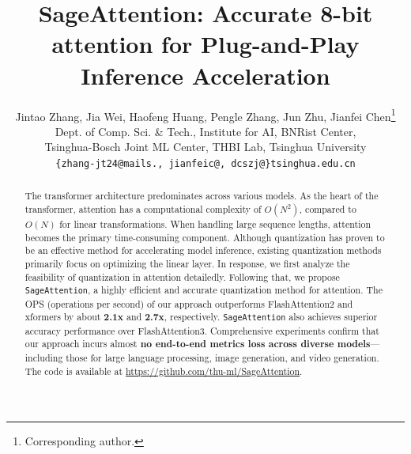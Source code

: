 \documentclass{article} %
\title{SageAttention: Accurate 8-bit attention for Plug-and-Play Inference Acceleration}
\author{Jintao Zhang, Jia Wei, Haofeng Huang, Pengle Zhang, Jun Zhu, Jianfei Chen\thanks{Corresponding author.} \\
Dept. of Comp. Sci. \& Tech., Institute for AI, BNRist Center,\\
Tsinghua-Bosch Joint ML Center, THBI Lab, Tsinghua University\\
\texttt{\{zhang-jt24@mails., jianfeic@, dcszj@\}tsinghua.edu.cn} }
\newcommand{\our}{\texttt{SageAttention}\xspace}
\newcommand{\jt}[1]{\textcolor{blue}{{#1}}\xspace}
\begin{document}
\maketitle

\begin{abstract}
The transformer architecture predominates across various models. As the heart of the transformer, attention has a computational complexity of $O(N^2)$, compared to $O(N)$ for linear transformations. When handling large sequence lengths, attention becomes the primary time-consuming component. Although quantization has proven to be an effective method for accelerating model inference, existing quantization methods primarily focus on optimizing the linear layer.
In response, we first analyze the feasibility of quantization in attention detailedly. Following that, we propose \our, a highly efficient and accurate quantization method for attention. The OPS (operations per second) of our approach outperforms FlashAttention2 and xformers by about \textbf{2.1x} and \textbf{2.7x}, respectively. \our also achieves superior accuracy performance over FlashAttention3. Comprehensive experiments confirm that our approach incurs almost \textbf{no end-to-end metrics loss across diverse models}—including those for large language processing, image generation, and video generation. The code is available at \jt{\url{https://github.com/thu-ml/SageAttention}}.


\end{abstract}












\newpage

\appendix

\end{document}
